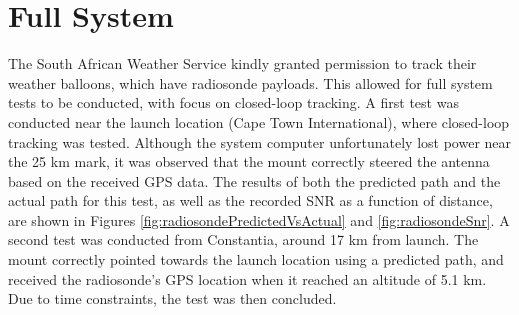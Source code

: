 \graphicspath{{./figures}}

\section{Full System}

The South African Weather Service kindly granted permission to track their weather balloons, which have radiosonde payloads. This allowed for full system tests to be conducted, with focus on closed-loop tracking. A first test was conducted near the launch location (Cape Town International), where closed-loop tracking was tested. Although the system computer unfortunately lost power near the 25 km mark, it was observed that the mount correctly steered the antenna based on the received GPS data. The results of both the predicted path and the actual path for this test, as well as the recorded SNR as a function of distance, are shown in Figures \ref{fig:radiosondePredictedVsActual} and \ref{fig:radiosondeSnr}. A second test was conducted from Constantia, around 17 km from launch. The mount correctly pointed towards the launch location using a predicted path, and received the radiosonde's GPS location when it reached an altitude of 5.1 km. Due to time constraints, the test was then concluded.

